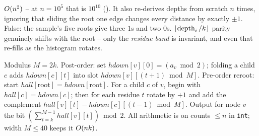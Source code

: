 \begin{thinkbox}
{$O(n^2)$ -- at $n=10^{5}$ that is $10^{10}$ (\tle). It also re-derives depths
from scratch $n$ times, ignoring that sliding the root one edge changes every
distance by exactly $\pm1$.}
{False: the sample's five roots give three $1$s and two $0$s. $\lfloor\operatorname{depth}_i/k\rfloor$
parity genuinely shifts with the root -- only the \emph{residue band} is invariant,
and even that re-fills as the histogram rotates.}
\end{thinkbox}

Modulus $M=2k$. Post-order: set $\mathit{hdown}[v][0] = (a_v \bmod 2)$; folding a
child $c$ adds $\mathit{hdown}[c][t]$ into slot $\mathit{hdown}[v][(t{+}1)\bmod M]$.
Pre-order reroot: start $\mathit{hall}[\text{root}] = \mathit{hdown}[\text{root}]$.
For a child $c$ of $v$, begin with $\mathit{hall}[c] = \mathit{hdown}[c]$; then for
each residue $t$ rotate by $+1$ and add the complement
$\mathit{hall}[v][t] - \mathit{hdown}[c][(t{-}1)\bmod M]$. Output for node $v$ the
bit $(\sum_{t=k}^{M-1}\mathit{hall}[v][t]) \bmod 2$. All arithmetic is on counts
$\le n$ in \lstinline{int}; width $M\le 40$ keeps it $O(nk)$.

